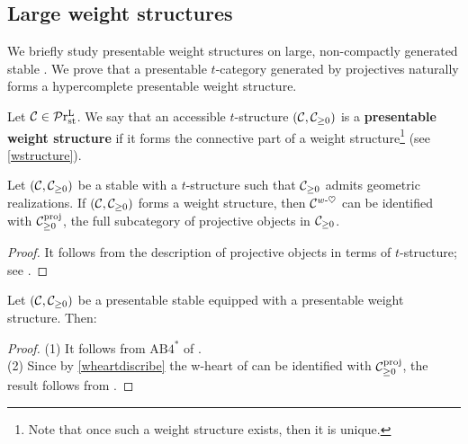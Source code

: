 \documentclass[a4paper,10pt, oneside]{amsart}
\begin{document}
\subsection{Large weight structures}
We briefly study presentable weight structures on large, non-compactly generated stable \infcats. We prove that a presentable $t$-category generated by projectives naturally forms a hypercomplete presentable weight structure.
\begin{de}
	Let $\mathcal{C}\in\mathcal{P}\mathrm{r}_{\mathrm{st}}^\mathrm{L}$. We say that an accessible $t$-structure $(\mathcal{C},\mathcal{C}_{\geq0})$ is a \textbf{presentable weight structure} if it forms  the connective part of a weight structure\footnote{Note that once such a weight structure exists, then it is unique.} (see \cref{wstructure}).
\end{de}

\begin{lem}\label{wheartdiscribe}
	Let $(\mathcal{C},\mathcal{C}_{\geq0})$ be a stable \infcat with a $t$-structure such that $\mathcal{C}_{\geq0}$ admits geometric realizations. If $(\mathcal{C},\mathcal{C}_{\geq0})$ forms  a weight structure, then $\mathcal{C}^{w\text{-}\heartsuit}$ can be  identified with $\mathcal{C}_{\geq0}^{\mathrm{proj}}$, the full subcategory of projective objects in $\mathcal{C}_{\geq0}$.
\end{lem}
\begin{proof}
	It follows from the description of projective objects in terms of $t$-structure; see \cite[Proposition 3.7]{hattt}.
\end{proof}
\begin{prop}\label{hycompleteimpliespsigamak}
	Let $(\mathcal{C},\mathcal{C}_{\geq0})$ be a presentable stable \infcat equipped with a presentable  weight structure. Then:
\end{prop}
\begin{proof}
	(1) It follows from $\mathrm{AB4}^*$ of \spgeq.\\
	(2) Since by \cref{wheartdiscribe} the w-heart of \mcc can be identified with $\mathcal{C}_{\geq0}^{\mathrm{proj}}$, the result follows from 	\cite[Proposition 1.17]{levy2025c}.
\end{proof}
\end{document}
